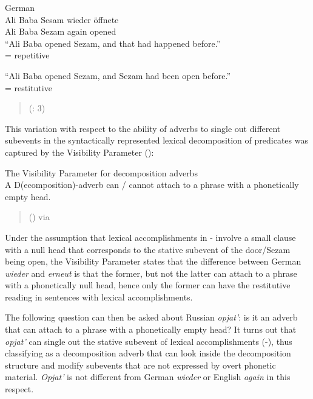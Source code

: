 \documentclass[output=paper,modfonts,nonflat,
 hidelinks
]{langsci/langscibook}
\begin{document}
 \ea\label{ex:bondarenko:}
{German}\\

\gll Ali Baba Sesam wieder öffnete\\
    Ali Baba Sezam again opened\\

\ea “Ali Baba opened Sezam, and that had happened before.”\\
= {repetitive}

\ex “Ali Baba opened Sezam, and Sezam had been open before.”\\
= {restitutive}
\z
\z

\begin{quote}
(\citealt{vonStechow1996}: 3)
\end{quote}


This variation with respect to the ability of adverbs to single out different subevents in the syntactically represented lexical decomposition of predicates was captured by the Visibility Parameter (\citealt{RappvonStechow1999,Beck2005}):


 \ea\label{ex:bondarenko:}
{The Visibility Parameter for decomposition adverbs}\\

\glt A D(ecomposition)-adverb can / cannot attach to a phrase with a phonetically empty head.
\z

\begin{quote}
(\citealt{RappvonStechow1999}) via \citep[13]{Beck2005}
\end{quote}


Under the assumption that lexical accomplishments in - involve a small clause with a null head that corresponds to the stative subevent of the door/Sezam being open, the Visibility Parameter states that the difference between German \textit{wieder} and \textit{erneut} is that the former, but not the latter can attach to a phrase with a phonetically null head, hence only the former can have the restitutive reading in sentences with lexical accomplishments.



The following question can then be asked about Russian \textit{opjat’}: is it an adverb that can attach to a phrase with a phonetically empty head? It turns out that \textit{opjat’} can single out the stative subevent of lexical accomplishments (-), thus classifying as a decomposition adverb that can look inside the decomposition structure and modify subevents that are not expressed by overt phonetic material. \textit{Opjat’} is not different from German \textit{wieder} or English \textit{again} in this respect.
\end{document}

